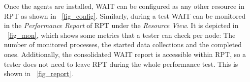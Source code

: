 \documentclass[runningheads,a4paper]{llncs}
\begin{document}
Once the agents are installed, WAIT can be configured as
any other resource in RPT as shown in \figurename ~\ref{fig_config}. Similarly,
during a test WAIT can be monitored in the \emph{Performance Report} of RPT
under the \emph{Resource View}. It is depicted in \figurename ~\ref{fig_mon},
which shows some metrics that a tester can check per node: The number
of monitored processes, the started data collections and the completed ones.
Additionally, the consolidated WAIT report is accessible within RPT, so a tester
does not need to leave RPT during the whole performance test. This is shown in \figurename ~\ref{fig_report}. 

\vspace{-5pt}
\end{document}
